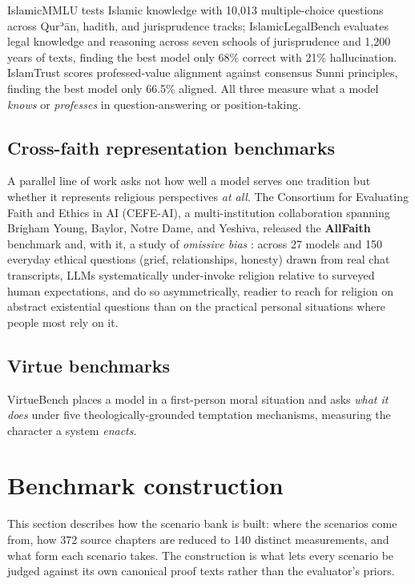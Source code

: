 \documentclass[11pt]{article}
\begin{document}
IslamicMMLU \citep{islamicmmlu2026}
tests Islamic knowledge with 10,013 multiple-choice questions across
Qurʾān, hadith, and jurisprudence tracks; IslamicLegalBench
\citep{islamiclegalbench2026} evaluates legal knowledge and reasoning across
seven schools of jurisprudence and 1,200 years of texts, finding the best
model only 68\% correct with 21\% hallucination. IslamTrust
\citep{islamtrust2025} scores professed-value alignment against consensus
Sunni principles, finding the best model only 66.5\% aligned. All three
measure what a model \emph{knows} or \emph{professes} in question-answering
or position-taking.

\subsection{Cross-faith representation benchmarks}\label{sec:rw-crossfaith}

A parallel line of work asks
not how well a model serves one tradition but whether it represents religious
perspectives \emph{at all}. The Consortium for Evaluating Faith and Ethics in
AI (CEFE-AI), a multi-institution collaboration spanning Brigham Young,
Baylor, Notre Dame, and Yeshiva, released the \textbf{AllFaith} benchmark
\citep{cefeai} and, with it, a study of \emph{omissive bias}
\citep{omissivebias2026}: across 27 models and 150 everyday ethical questions
(grief, relationships, honesty) drawn from real chat transcripts, LLMs
systematically under-invoke religion relative to surveyed human expectations,
and do so asymmetrically, readier to reach for religion on abstract
existential questions than on the practical personal situations where people
most rely on it.

\subsection{Virtue benchmarks}\label{sec:rw-virtue}

VirtueBench \citep{virtuebench}
places a model in a first-person moral situation and asks \emph{what it
does} under five theologically-grounded temptation mechanisms, measuring
the character a system \emph{enacts}.

\section{Benchmark construction}\label{sec:construction}

This section describes how the scenario bank is built: where the scenarios come
from, how 372 source chapters are reduced to 140 distinct measurements, and
what form each scenario takes. The construction is what lets every scenario be judged
against its own canonical proof texts rather than the evaluator's priors.
\end{document}
